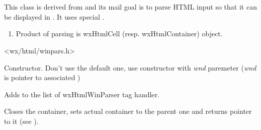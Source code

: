 %
%


\section{}\label{wxhtmlwinparser}

This class is derived from  and
its mail goal is to parse HTML input so that it can be displayed in
. It uses special
.


\begin{enumerate}
\item Product of parsing is wxHtmlCell (resp. wxHtmlContainer) object.
\end{enumerate}





<wx/html/winpars.h>




\label{wxhtmlwinparserwxhtmlwinparser}



Constructor. Don't use the default one, use constructor with
{\it wnd} paremeter ({\it wnd} is pointer to associated )

\label{wxhtmlwinparseraddmodule}


Adds  to the list of wxHtmlWinParser tag handler.

\label{wxhtmlwinparserclosecontainer}


Closes the container, sets actual container to the parent one
and returns pointer to it (see ).

